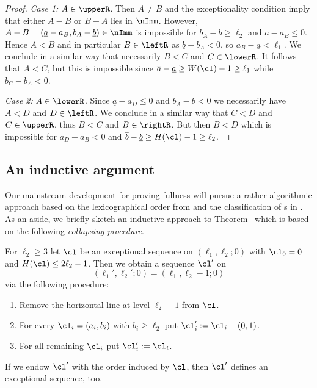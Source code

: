 \begin{proof}
{\em Case 1:} $A\in\upperR$. Then 
$A\not= B$ and the exceptionality 
condition imply that either $A-B$ 
or $B-A$ lies in $\nImm$. However, 
$A-B=(\underline a-a_B,b_A-
\underline b)\in\nImm$ is impossible 
for $b_A-\underline b\geq\ell_2$ and 
$\underline a-a_B\leq0$. Hence $A<B$ 
and in particular $B\in\leftR$ as 
$\underline b-b_A<0$, so 
$a_B-\underline a<\ell_1$. We conclude 
in a similar way that necessarily 
$B<C$ and $C\in\lowerR$. It follows 
that $A<C$, but this is impossible 
since 
$\overline a-\underline a\geq W(\cl)-1\geq\ell_1$ 
while $b_C-b_A<0$.

{\em Case 2:} $A\in\lowerR$. Since 
$\underline a-a_D\leq0$ and 
$b_A-\overline b<0$ we necessarily 
have $A<D$ and $D\in\leftR$. We 
conclude in a similar way that $C<D$ 
and $C\in\upperR$, thus $B<C$ and 
$B\in\rightR$. But then $B<D$ which 
is impossible for $a_D-a_B<0$ and 
$\overline b-\underline b\geq 
H(\cl)-1\geq\ell_2$.
\end{proof}

\subsection{An inductive argument}
\label{subsec:indArg}
Our mainstream development for proving fullness
will pursue a rather algorithmic approach based 
on the lexicographical order from  
and the classification of {\mes}s in . 
As an aside, we briefly sketch an inductive approach to 
Theorem~{\thFull} which is based {on the following}
{\em collapsing procedure}.

\begin{lemma}
\label{lem:ProductColl}
For $\ell_2\geq3$ let $\cl$ be an exceptional 
sequence on $(\ell_1,\ell_2;0)$ with $\cl_0=0$
and $H(\cl)\leq2\ell_2-1$. Then we obtain a 
sequence $\cl'$ on 
$$
(\ell_1',\ell_2';0)=(\ell_1,\ell_2-1;0)
$$ 
via the following procedure:
\begin{enumerate}
\item[(i)] 
Remove the horizontal line at level $\ell_2-1$ 
from $\cl$.
\vspace{1ex}
\item[(ii)] 
For every $\cl_i=(a_i,b_i)$ with $b_i\geq\ell_2$
put $\cl'_i:=\cl_i-(0,1)$.
\vspace{1ex}
\item[(iii)] 
For all remaining $\cl_i$ put $\cl_i':=\cl_i$.
\end{enumerate}
If we endow $\cl'$ with the order induced by $\cl$,
then $\cl'$ defines an exceptional sequence, too. 
\end{lemma}

